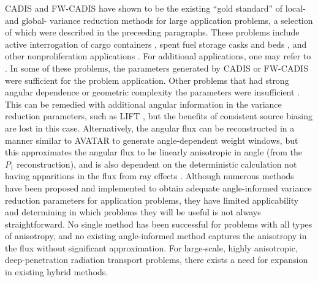CADIS and FW-CADIS have shown to be the existing ``gold standard'' of local- and
global- variance reduction methods for large application problems, a selection
of which were described in the preceeding paragraphs.
These problems include active interrogation of cargo containers
\cite{mosher_automated_2009}, spent fuel storage casks \cite{chen_surface_2011,
radulescu_dose_2013}
and beds \cite{sheu_dose_2011}, and other nonproliferation applications
\cite{somasundaram_implementation_2013}. For additional
applications, one may refer to \cite{wagner_review_2011}.
In some of these problems, the
parameters generated by CADIS or FW-CADIS were sufficient for the problem
application. Other problems that had strong angular dependence or geometric
complexity the parameters were insufficient \cite{chen_surface_2011,
somasundaram_implementation_2013, peplow_consistent_2012}.
This can be remedied with additional angular
information in the variance reduction parameters, such as LIFT
\cite{somasundaram_implementation_2013}, but the benefits of consistent source
biasing are lost in this case. Alternatively, the angular flux can be
reconstructed in a manner similar to AVATAR
\cite{sweezy_automated_2005, peplow_consistent_2012} to generate angle-dependent
weight windows, but this approximates the angular flux to be linearly
anisotropic in angle (from the $P_1$ reconstruction), and is also dependent on
the deterministic calculation not having apparitions in the flux from ray
effects \cite{sweezy_automated_2005}. Although numerous methods have been
proposed and implemented to obtain adequate angle-informed variance reduction
parameters for application problems, they have limited applicability
\cite{peplow_consistent_2012} and determining in which problems they will be
useful is not always straightforward. No single method has been successful
for problems with all types of anisotropy, and no existing angle-informed method
captures the anisotropy in the flux without significant approximation. For
large-scale, highly anisotropic, deep-penetration radiation transport problems,
there exists a need for expansion in existing hybrid methods.

